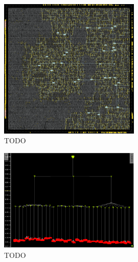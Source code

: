 \documentclass[a4paper, 12pt]{article}
\begin{document}

\begin{figure} [h]
	\centering
	\includegraphics[width=0.6\textwidth]{clock_tree.png}
	\caption{TODO}
	\label{fig:clock-tree}
\end{figure}


\begin{figure} [h]
	\centering
	\includegraphics[width=0.6\textwidth]{cts.png}
	\caption{TODO}
	\label{fig:clock-tree-latency}
\end{figure}



 
\end{document}
